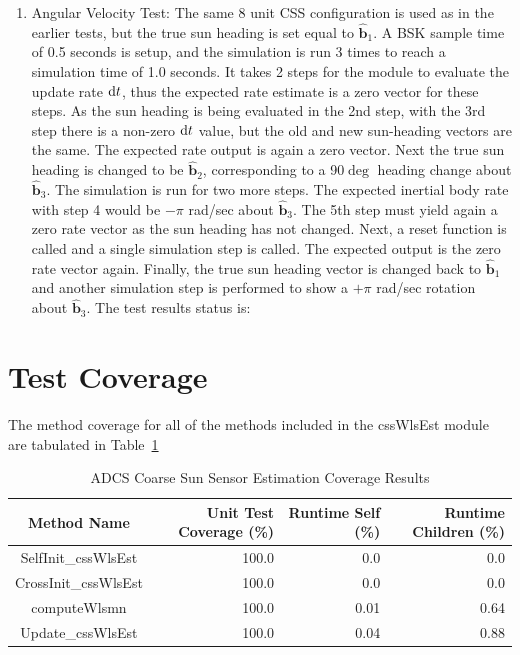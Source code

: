 \documentclass[]{BasiliskReportMemo}
\begin{document}
\begin{enumerate}
   \item{Angular Velocity Test:  The same 8 unit CSS configuration is used as in the earlier tests, but the true sun heading is set equal to $\hat{\bm b}_{1}$.  A BSK sample time of 0.5 seconds is setup, and the simulation is run 3 times to reach a simulation time of 1.0 seconds.  It takes 2 steps for the module to evaluate the update rate $\D t$, thus the expected rate estimate is a zero vector for these steps.  As the sun heading is being evaluated in the 2nd step, with the 3rd step there is a non-zero $\D t$ value, but the old and new sun-heading vectors are the same.  The expected rate output is again a zero vector.  Next the true sun heading is changed to be $\hat{\bm b}_{2}$, corresponding to a 90$\deg$ heading change about $\hat{\bm b}_{3}$.  The simulation is run for two more steps. The expected inertial body rate with step 4 would be $-\pi$ rad/sec about $\hat{\bm b}_{3}$.  The 5th step must yield again a zero rate vector as the sun heading has not changed.  Next, a reset function is called and a single simulation step is called.  The expected output is the zero rate vector again.  Finally, the true sun heading vector is changed back to $\hat{\bm b}_{1}$ and another simulation step is performed to show a $+\pi$ rad/sec rotation about $\hat{\bm b}_{3}$.  
   The test results status is: }
\end{enumerate}

\section{Test Coverage}
The method coverage for all of the methods included in the cssWlsEst 
module are tabulated in Table~\ref{tab:cov_met}

\begin{table}[htbp]
    \caption{ADCS Coarse Sun Sensor Estimation Coverage Results}
   \label{tab:cov_met}
        \centering \fontsize{10}{10}\selectfont
   \begin{tabular}{c | r | r | r} %
      \hline
      Method Name    & Unit Test Coverage (\%) & Runtime Self (\%) & Runtime Children (\%) \\
      \hline
      SelfInit\_cssWlsEst& 100.0 & 0.0 & 0.0 \\
      CrossInit\_cssWlsEst & 100.0 & 0.0 & 0.0 \\
      computeWlsmn & 100.0 & 0.01 & 0.64 \\
      Update\_cssWlsEst & 100.0 & 0.04 & 0.88 \\
      \hline
   \end{tabular}
\end{table}
\end{document}
